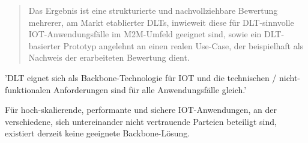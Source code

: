 \documentclass[
    ngerman,american
    ]{scrartcl}
\newcommand{\lang}{de}
\begin{document}
\begin{abstract}
	Das Ergebnis ist eine strukturierte und nachvollziehbare Bewertung mehrerer, am Markt etablierter DLTs, inwieweit diese für DLT-sinnvolle IOT-Anwendungsfälle im M2M-Umfeld geeignet sind, sowie ein DLT-basierter Prototyp angelehnt an einen realen Use-Case, der beispielhaft als Nachweis der erarbeiteten Bewertung dient.

\end{abstract}

\newpage

\sectionThesis{\lang}
\sectionThesisDescription{\lang}
'DLT eignet sich als Backbone-Technologie für IOT und die technischen / nicht-funktionalen Anforderungen sind für alle Anwendungsfälle gleich.'
\sectionQuestions{\lang}
\sectionQuestionsDescription{\lang}

\begin{description}[style=unboxed]
	\item [\questionOne{\lang}]

	Für hoch-skalierende, performante und sichere IOT-Anwendungen, an der verschiedene, sich untereinander nicht vertrauende Parteien beteiligt sind, existiert derzeit keine geeignete Backbone-Lösung.


\end{description}
\end{document}
